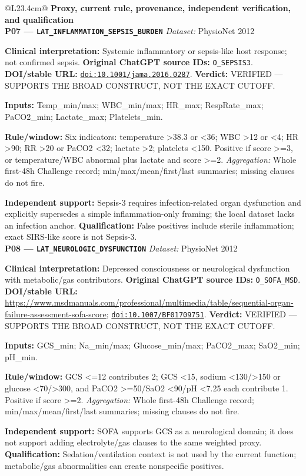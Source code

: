 \begin{tabular}{@{}L{23.4cm}@{}}
\toprule
\textbf{Proxy, current rule, provenance, independent verification, and qualification}\\
\midrule
\textbf{P07 --- \nolinkurl{LAT_INFLAMMATION_SEPSIS_BURDEN}} \hfill \textit{Dataset:} PhysioNet 2012\par\textbf{Clinical interpretation:} Systemic inflammatory or sepsis-like host response; not confirmed sepsis. \textbf{Original ChatGPT source IDs:} \nolinkurl{O_SEPSIS3}. \textbf{DOI/stable URL:} \href{https://doi.org/10.1001/jama.2016.0287}{\nolinkurl{doi:10.1001/jama.2016.0287}}. \textbf{Verdict:} VERIFIED --- SUPPORTS THE BROAD CONSTRUCT, NOT THE EXACT CUTOFF.\par\textbf{Inputs:} Temp\_min/max; WBC\_min/max; HR\_max; RespRate\_max; PaCO2\_min; Lactate\_max; Platelets\_min.\par\textbf{Rule/window:} Six indicators: temperature >38.3 or <36; WBC >12 or <4; HR >90; RR >20 or PaCO2 <32; lactate >2; platelets <150. Positive if score >=3, or temperature/WBC abnormal plus lactate and score >=2. \textit{Aggregation:} Whole first-48h Challenge record; min/max/mean/first/last summaries; missing clauses do not fire.\par\textbf{Independent support:} Sepsis-3 requires infection-related organ dysfunction and explicitly supersedes a simple inflammation-only framing; the local dataset lacks an infection anchor. \textbf{Qualification:} False positives include sterile inflammation; exact SIRS-like score is not Sepsis-3. \\
\addlinespace[3pt]
\midrule
\textbf{P08 --- \nolinkurl{LAT_NEUROLOGIC_DYSFUNCTION}} \hfill \textit{Dataset:} PhysioNet 2012\par\textbf{Clinical interpretation:} Depressed consciousness or neurological dysfunction with metabolic/gas contributors. \textbf{Original ChatGPT source IDs:} \nolinkurl{O_SOFA_MSD}. \textbf{DOI/stable URL:} \url{https://www.msdmanuals.com/professional/multimedia/table/sequential-organ-failure-assessment-sofa-score}; \allowbreak \href{https://doi.org/10.1007/BF01709751}{\nolinkurl{doi:10.1007/BF01709751}}. \textbf{Verdict:} VERIFIED --- SUPPORTS THE BROAD CONSTRUCT, NOT THE EXACT CUTOFF.\par\textbf{Inputs:} GCS\_min; Na\_min/max; Glucose\_min/max; PaCO2\_max; SaO2\_min; pH\_min.\par\textbf{Rule/window:} GCS <=12 contributes 2; GCS <15, sodium <130/>150 or glucose <70/>300, and PaCO2 >=50/SaO2 <90/pH <7.25 each contribute 1. Positive if score >=2. \textit{Aggregation:} Whole first-48h Challenge record; min/max/mean/first/last summaries; missing clauses do not fire.\par\textbf{Independent support:} SOFA supports GCS as a neurological domain; it does not support adding electrolyte/gas clauses to the same weighted proxy. \textbf{Qualification:} Sedation/ventilation context is not used by the current function; metabolic/gas abnormalities can create nonspecific positives. \\

\end{tabular}
